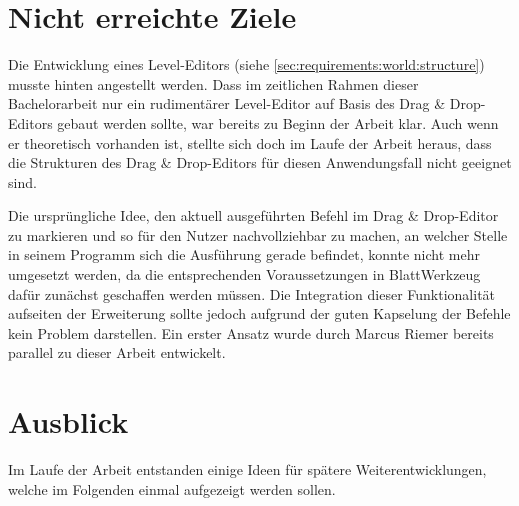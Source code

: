 \section{Nicht erreichte Ziele}
\label{sec:conclusion:open}

Die Entwicklung eines Level-Editors (siehe \ref{sec:requirements:world:structure}) musste hinten angestellt werden. Dass im zeitlichen Rahmen dieser Bachelorarbeit nur ein rudimentärer Level-Edi\-tor auf Basis des Drag \& Drop-Edi\-tors gebaut werden sollte, war bereits zu Beginn der Arbeit klar. Auch wenn er theoretisch vorhanden ist, stellte sich doch im Laufe der Arbeit heraus, dass die Strukturen des Drag \& Drop-Edi\-tors für diesen Anwendungsfall nicht geeignet sind.

Die ursprüngliche Idee, den aktuell ausgeführten Befehl im Drag \& Drop-Edi\-tor zu markieren und so für den Nutzer nachvollziehbar zu machen, an welcher Stelle in seinem Programm sich die Ausführung gerade befindet, konnte nicht mehr umgesetzt werden, da die entsprechenden Voraussetzungen in BlattWerkzeug dafür zunächst geschaffen werden müssen. Die Integration dieser Funktionalität aufseiten der Erweiterung sollte jedoch aufgrund der guten Kapselung der Befehle kein Problem darstellen. Ein erster Ansatz wurde durch Marcus Riemer bereits parallel zu dieser Arbeit entwickelt.

\section{Ausblick}
\label{sec:conclusion:future}

Im Laufe der Arbeit entstanden einige Ideen für spätere Weiterentwicklungen, welche im Folgenden einmal aufgezeigt werden sollen.

